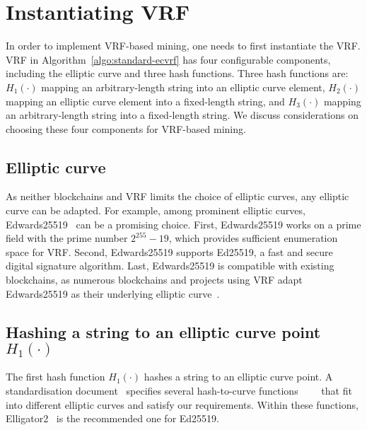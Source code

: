 \section{Instantiating VRF}
\label{sec:instantiation}

In order to implement VRF-based mining, one needs to first instantiate the VRF.
VRF in Algorithm~\ref{algo:standard-ecvrf} has four configurable components, including the elliptic curve and three hash functions.
Three hash functions are:
$H_{1}(\cdot)$ mapping an arbitrary-length string into an elliptic curve element,
$H_{2}(\cdot)$ mapping an elliptic curve element into a fixed-length string, and
$H_{3}(\cdot)$ mapping an arbitrary-length string into a fixed-length string.
We discuss considerations on choosing these four components for VRF-based mining.





\subsection{Elliptic curve}
As neither blockchains and VRF limits the choice of elliptic curves, any elliptic curve can be adapted.
For example, among prominent elliptic curves, Edwards25519~\cite{bernstein2012high} can be a promising choice.
First, Edwards25519 works on a prime field with the prime number $2^{255} - 19$, which provides sufficient enumeration space for VRF.
Second, Edwards25519 supports Ed25519, a fast and secure digital signature algorithm.
Last, Edwards25519 is compatible with existing blockchains, as numerous blockchains and projects using VRF adapt Edwards25519 as their underlying elliptic curve~\cite{ethereum}\cite{tendermint}\cite{monero}.



\subsection{Hashing a string to an elliptic curve point $H_{1}(\cdot)$}
The first hash function $H_{1}(\cdot)$ hashes a string to an elliptic curve point.
A standardisation document~\cite{scott2019hashing} specifies several hash-to-curve functions~\cite{icart2009hash}~\cite{ulas2007rational}~\cite{brier2010efficient}~\cite{bernstein2013elligator} that fit into different elliptic curves and satisfy our requirements.
Within these functions, Elligator2~\cite{bernstein2013elligator} is the recommended one for Ed25519.




